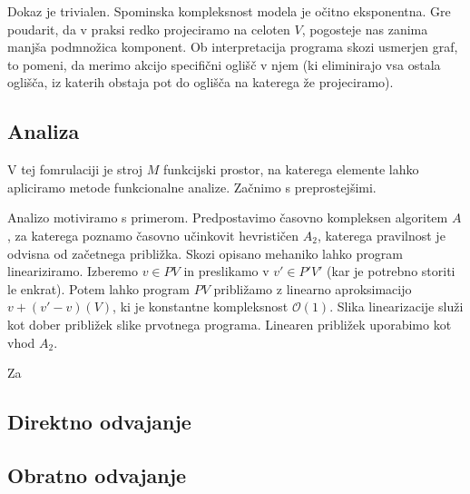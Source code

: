 \documentclass{article}
\begin{document}
 Dokaz je trivialen. Spominska kompleksnost modela je očitno eksponentna. Gre poudarit, da v praksi redko projeciramo na celoten $V$, pogosteje nas zanima manjša podmnožica komponent. Ob interpretacija programa skozi usmerjen graf, to pomeni, da merimo akcijo specifični oglišč v njem (ki eliminirajo vsa ostala oglišča, iz katerih obstaja pot do oglišča na katerega že projeciramo).
 
 
 \subsection{Analiza}
 
 V tej fomrulaciji je stroj $M$ funkcijski prostor,  na katerega elemente lahko apliciramo metode funkcionalne analize. Začnimo s preprostejšimi.
 
 Analizo motiviramo s primerom. Predpostavimo časovno kompleksen algoritem $A$, za katerega poznamo časovno učinkovit hevrističen $A_2$, katerega pravilnost je odvisna od začetnega približka. Skozi opisano mehaniko lahko program lineariziramo.
 Izberemo $v\in PV$ in preslikamo v $v'\in P'V'$ (kar je potrebno storiti le enkrat). Potem lahko program $PV$ približamo z linearno aproksimacijo $v+(v'-v) (V)$, ki je konstantne kompleksnost $\mathcal{O}(1)$.
 Slika linearizacije služi kot dober približek slike prvotnega programa. Linearen približek uporabimo kot vhod $A_2$.
 
 Za
\subsection{Direktno odvajanje}
\subsection{Obratno odvajanje}
\end{document}
